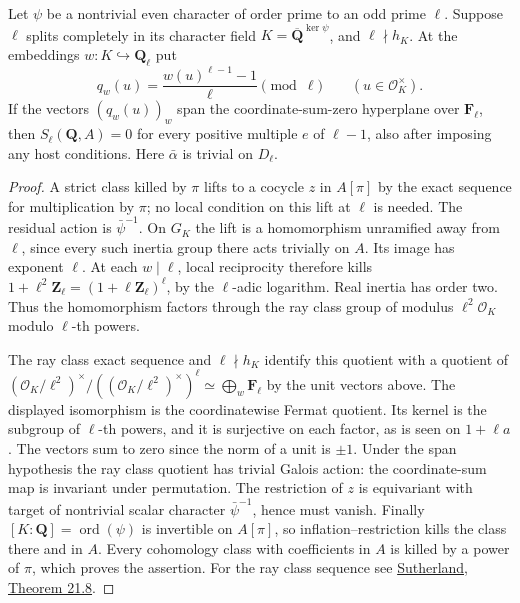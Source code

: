 \begin{proposition}\label{famsel:splitray}
Let \(\psi\) be a nontrivial even character of order prime to an odd
prime \(\ell\). Suppose \(\ell\) splits completely in its character
field \(K=\overline{\mathbf Q}^{\ker\psi}\), and \(\ell\nmid h_K\).
At the embeddings \(w:K\hookrightarrow\mathbf Q_\ell\) put
\[
 q_w(u)=\frac{w(u)^{\ell-1}-1}{\ell}\pmod\ell
 \qquad(u\in\mathcal O_K^\times).
\]
If the vectors \((q_w(u))_w\) span the coordinate-sum-zero hyperplane
over \(\mathbf F_\ell\), then \(S_\ell(\mathbf Q,A)=0\) for every
positive multiple \(e\) of \(\ell-1\), also after imposing any host
conditions. Here \(\bar\alpha\) is trivial on \(D_\ell\).
\end{proposition}
\begin{proof}
A strict class killed by \(\pi\) lifts to a cocycle \(z\) in
\(A[\pi]\) by the exact sequence for multiplication by \(\pi\);
no local condition on this lift at \(\ell\) is needed. The residual
action is \(\bar\psi^{-1}\). On \(G_K\) the lift is a homomorphism
unramified away from \(\ell\), since every such inertia group there
acts trivially on \(A\). Its image has exponent \(\ell\). At each
\(w\mid\ell\), local reciprocity therefore kills
\(1+\ell^2\mathbf Z_\ell=(1+\ell\mathbf Z_\ell)^\ell\), by the
\(\ell\)-adic logarithm. Real inertia has order two. Thus the
homomorphism factors through the ray class group of modulus
\(\ell^2\mathcal O_K\) modulo \(\ell\)-th powers.

The ray class exact sequence and \(\ell\nmid h_K\) identify this
quotient with a quotient of
\((\mathcal O_K/\ell^2)^\times/
((\mathcal O_K/\ell^2)^\times)^\ell\simeq\bigoplus_w\mathbf F_\ell\)
by the unit vectors above. The displayed isomorphism is the
coordinatewise Fermat quotient. Its kernel is the subgroup of
\(\ell\)-th powers, and it is surjective on each factor, as is seen
on \(1+\ell a\). The vectors sum to zero since the norm of a unit is
\(\pm1\). Under the span hypothesis the ray class quotient has trivial
Galois action: the coordinate-sum map is invariant under permutation.
The restriction of \(z\) is equivariant with target of nontrivial
scalar character \(\bar\psi^{-1}\), hence must vanish. Finally
\([K:\mathbf Q]=\operatorname{ord}(\psi)\) is invertible on \(A[\pi]\),
so inflation--restriction kills the class there and in \(A\).
Every cohomology class with coefficients in \(A\) is killed by a power of \(\pi\), which proves the assertion.
For the ray class sequence see
\href{https://math.mit.edu/classes/18.785/2021fa/LectureNotes21.pdf\#page=5}{Sutherland, Theorem 21.8}.
\end{proof}

